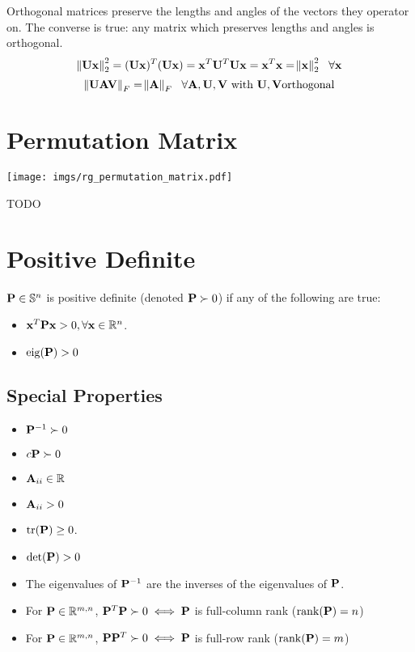 Orthogonal matrices preserve the lengths and angles of the vectors they operator on. The converse is true: any matrix which preserves lengths and angles is orthogonal.
\begin{equation}
\norm{\mathbf{U} \mathbf{x}}^2_2=(\mathbf{U}\mathbf{x})^T(\mathbf{U}\mathbf{x})=\mathbf{x}^T\mathbf{U}^T\mathbf{U}\mathbf{x}=\mathbf{x}^T\mathbf{x}=\norm{\mathbf{x}}^2_2~~\forall \mathbf{x}
\end{equation}
\begin{equation}
\norm{\mathbf{U} \mathbf{A} \mathbf{V}}_F=\norm{\mathbf{A}}_F~~\forall \mathbf{A},\mathbf{U},\mathbf{V}~\textrm{with}~\mathbf{U},\mathbf{V} \textrm{orthogonal}
\end{equation}



\section{Permutation Matrix}
\begin{center}
\texttt{[image: imgs/rg\_permutation\_matrix.pdf]}
\end{center}

TODO



\section{Positive Definite}

$\mathbf{P}\in\mathbb{S}^{n}$ is positive definite (denoted $\mathbf{P}\succ0$) if any of the following are true:
\begin{itemize}
\item $\mathbf{x}^T\mathbf{P}\mathbf{x}>0,\forall\mathbf{x}\in\mathbb{R}^{n}$.
\item $\operatorname{eig}(\mathbf{P})>0$
\end{itemize}


\subsection*{Special Properties}

\begin{itemize}
\item $\mathbf{P}^{-1}\succ0$
\item $c\mathbf{P}\succ0$
\item $\mathbf{A}_{ii}\in\mathbb{R}$
\item $\mathbf{A}_{ii}>0$
\item $\operatorname{tr}(\mathbf{P})\ge0$. %
\item $\det(\mathbf{P})>0$
\item The eigenvalues of $\mathbf{P}^{-1}$ are the inverses of the eigenvalues of $\mathbf{P}$.
\item For $\mathbf{P}\in\mathbb{R}^{m,n}$, $\mathbf{P}^T\mathbf{P}\succ0\iff \mathbf{P}$ is full-column rank ($\operatorname{rank}(\mathbf{P})=n$)
\item For $\mathbf{P}\in\mathbb{R}^{m,n}$, $\mathbf{P}\mathbf{P}^T\succ0\iff \mathbf{P}$ is full-row rank ($\operatorname{rank}(\mathbf{P})=m$)
\end{itemize}

